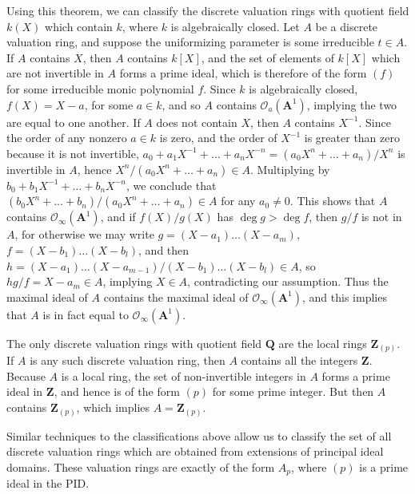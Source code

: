 \begin{example}
    Using this theorem, we can classify the discrete valuation rings with quotient field $k(X)$ which contain $k$, where $k$ is algebraically closed. Let $A$ be a discrete valuation ring, and suppose the uniformizing parameter is some irreducible $t \in A$. If $A$ contains $X$, then $A$ contains $k[X]$, and the set of elements of $k[X]$ which are not invertible in $A$ forms a prime ideal, which is therefore of the form $(f)$ for some irreducible monic polynomial $f$. Since $k$ is algebraically closed, $f(X) = X - a$, for some $a \in k$, and so $A$ contains $\mathcal{O}_a(\mathbf{A}^1)$, implying the two are equal to one another. If $A$ does not contain $X$, then $A$ contains $X^{-1}$. Since the order of any nonzero $a \in k$ is zero, and the order of $X^{-1}$ is greater than zero because it is not invertible, $a_0 + a_1X^{-1} + \dots + a_nX^{-n} = (a_0X^n + \dots + a_n)/X^n$ is invertible in $A$, hence $X^n/(a_0X^n + \dots + a_n) \in A$. Multiplying by $b_0 + b_1X^{-1} + \dots + b_nX^{-n}$, we conclude that $(b_0X^n + \dots + b_n)/(a_0X^n + \dots + a_n) \in A$ for any $a_0 \neq 0$. This shows that $A$ contains $\mathcal{O}_\infty(\mathbf{A}^1)$, and if $f(X)/g(X)$ has $\deg g > \deg f$, then $g/f$ is not in $A$, for otherwise we may write $g = (X-a_1) \dots (X-a_m)$, $f = (X-b_1) \dots (X - b_l)$, and then $h = (X-a_1) \dots (X-a_{m-1})/(X-b_1) \dots (X-b_l) \in A$, so $hg/f = X - a_m \in A$, implying $X \in A$, contradicting our assumption. Thus the maximal ideal of $A$ contains the maximal ideal of $\mathcal{O}_\infty(\mathbf{A}^1)$, and this implies that $A$ is in fact equal to $\mathcal{O}_\infty(\mathbf{A}^1)$.
\end{example}

\begin{example}
    The only discrete valuation rings with quotient field $\mathbf{Q}$ are the local rings $\mathbf{Z}_{(p)}$. If $A$ is any such discrete valuation ring, then $A$ contains all the integers $\mathbf{Z}$. Because $A$ is a local ring, the set of non-invertible integers in $A$ forms a prime ideal in $\mathbf{Z}$, and hence is of the form $(p)$ for some prime integer. But then $A$ contains $\mathbf{Z}_{(p)}$, which implies $A = \mathbf{Z}_{(p)}$.
\end{example}

Similar techniques to the classifications above allow us to classify the set of all discrete valuation rings which are obtained from extensions of principal ideal domains. These valuation rings are exactly of the form $A_p$, where $(p)$ is a prime ideal in the PID.

